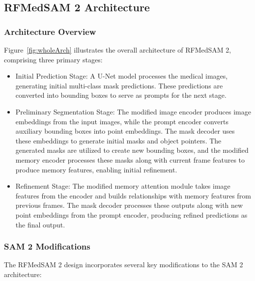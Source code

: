 \subsection{RFMedSAM 2 Architecture}

\subsubsection{Architecture Overview}

Figure~\ref{fig:wholeArch} illustrates the overall architecture of RFMedSAM 2, comprising three primary stages:

\begin{itemize}
\item Initial Prediction Stage: A U-Net model processes the medical images, generating initial multi-class mask predictions. These predictions are converted into bounding boxes to serve as prompts for the next stage.
\item Preliminary Segmentation Stage: The modified image encoder produces image embeddings from the input images, while the prompt encoder converts auxiliary bounding boxes into point embeddings. The mask decoder uses these embeddings to generate initial masks and object pointers. The generated masks are utilized to create new bounding boxes, and the modified memory encoder processes these masks along with current frame features to produce memory features, enabling initial refinement.
\item Refinement Stage: The modified memory attention module takes image features from the encoder and builds relationships with memory features from previous frames. The mask decoder processes these outputs along with new point embeddings from the prompt encoder, producing refined predictions as the final output.
\end{itemize}

\subsubsection{SAM 2 Modifications}

The RFMedSAM 2 design incorporates several key modifications to the SAM 2 architecture:

